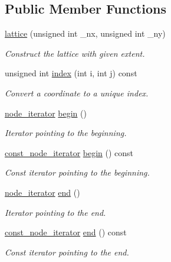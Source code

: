\subsection*{\-Public \-Member \-Functions}
\begin{DoxyCompactItemize}
\item 
\hyperlink{classlb_1_1lattice_a0769d0e72beae9e888156cf385f90660}{lattice} (unsigned int \-\_\-nx, unsigned int \-\_\-ny)
\begin{DoxyCompactList}\small\item\em \-Construct the lattice with given extent. \end{DoxyCompactList}\item 
unsigned int \hyperlink{classlb_1_1lattice_adaf6217dfdbc90f4df1aeedf51322412}{index} (int i, int j) const 
\begin{DoxyCompactList}\small\item\em \-Convert a coordinate to a unique index. \end{DoxyCompactList}\item 
\hyperlink{classlb_1_1lattice_ac99739da5030b2f0c3d28618d2db83b8}{node\-\_\-iterator} \hyperlink{classlb_1_1lattice_a792ad76d690ddcf96bfdccbdc041e633}{begin} ()
\begin{DoxyCompactList}\small\item\em \-Iterator pointing to the beginning. \end{DoxyCompactList}\item 
\hyperlink{classlb_1_1lattice_aa19f16e07ac70d4eddb4c3bdca1a314a}{const\-\_\-node\-\_\-iterator} \hyperlink{classlb_1_1lattice_ae1e6e7bdba8f9298d5965290933bb75e}{begin} () const 
\begin{DoxyCompactList}\small\item\em \-Const iterator pointing to the beginning. \end{DoxyCompactList}\item 
\hyperlink{classlb_1_1lattice_ac99739da5030b2f0c3d28618d2db83b8}{node\-\_\-iterator} \hyperlink{classlb_1_1lattice_a384d328bae76fc784dacde1478270897}{end} ()
\begin{DoxyCompactList}\small\item\em \-Iterator pointing to the end. \end{DoxyCompactList}\item 
\hyperlink{classlb_1_1lattice_aa19f16e07ac70d4eddb4c3bdca1a314a}{const\-\_\-node\-\_\-iterator} \hyperlink{classlb_1_1lattice_a6c9a2012a4ea7221834631c89f585bd0}{end} () const 
\begin{DoxyCompactList}\small\item\em \-Const iterator pointing to the end. \end{DoxyCompactList}\item 

\end{DoxyCompactItemize}
